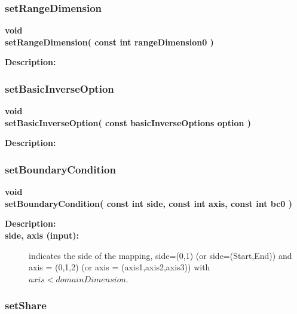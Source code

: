 \subsubsection{setRangeDimension}
 
\begin{flushleft} \textbf{%
void  \\ 
\settowidth{\MappingIncludeArgIndent}{setRangeDimension(}%
setRangeDimension( const int rangeDimension0 )
}\end{flushleft}
\begin{description}
\item[{\bf Description:}] 
\end{description}
\subsubsection{setBasicInverseOption}
 
\begin{flushleft} \textbf{%
void  \\ 
\settowidth{\MappingIncludeArgIndent}{setBasicInverseOption(}%
setBasicInverseOption( const basicInverseOptions option )
}\end{flushleft}
\begin{description}
\item[{\bf Description:}] 
\end{description}
\subsubsection{setBoundaryCondition}
 
\begin{flushleft} \textbf{%
void  \\ 
\settowidth{\MappingIncludeArgIndent}{setBoundaryCondition(}%
setBoundaryCondition( const int side, const int axis, const int bc0 )
}\end{flushleft}
\begin{description}
\item[{\bf Description:}] 
\item[{\bf side, axis (input):}]  indicates the side of the mapping, side=(0,1) (or side=(Start,End)) 
     and axis = (0,1,2) (or axis = (axis1,axis2,axis3)) with $axis<domainDimension$.
\end{description}
\subsubsection{setShare}
 
